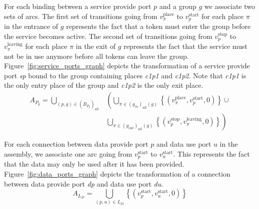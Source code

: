 For each binding between a service provide port $p$ and a group $g$ we
associate two sets of arcs. The first set of transitions going from
$v_\pi^\text{place}$ to $v_p^\text{start}$ for each place $\pi$ in the
entrance of $g$ represents the fact that a token must enter the group
before the service becomes active. The second set of transitions going
from $v_p^\text{stop}$ to $v_\pi^\text{leaving}$ for each place
$\pi$ in the exit of $g$ represents the fact that the service must not
be in use anymore before all tokens can leave the group.
Figure~\ref{fig:service_ports_graph} depicts the transformation of a
service provide port \emph{sp} bound to the group containing places
\emph{c1p1} and \emph{c1p2}. Note that \emph{c1p1} is the only entry
place of the group and \emph{c1p2} is the only exit place.
\begin{align*}
A_{P_{p}}=\bigcup_{\left(p,g\right)\in\left(B_{P_{p}}\right)_{all}} & \left( \bigcup_{\pi\in\left(g_{in}\right)_{all}\left(g\right)}\left\{ \left(v_\pi^\text{place},v_p^\text{start},0\right)\right\} \cup \right. \\
 & \left. \bigcup_{\pi\in\left(g_{out}\right)_{all}\left(g\right)}\left\{ \left(v_p^\text{stop},v_\pi^\text{leaving},0\right)\right\} \right)
\end{align*}

For each connection between data provide port $p$ and data use port $u$
in the assembly, we associate one arc going from $v_p^\text{start}$ to
$v_u^\text{start}$. This represents the fact that the data may only be
used after it has been provided.
Figure~\ref{fig:data_ports_graph} depicts the transformation of a
connection between data provide port \emph{dp} and data use port
\emph{du}.
\[
A_{L_{D}}=\bigcup_{\left(p,u\right)\in L_{D}}\left\{ \left(v_p^\text{start},v_u^\text{start},0\right)\right\} 
\]

